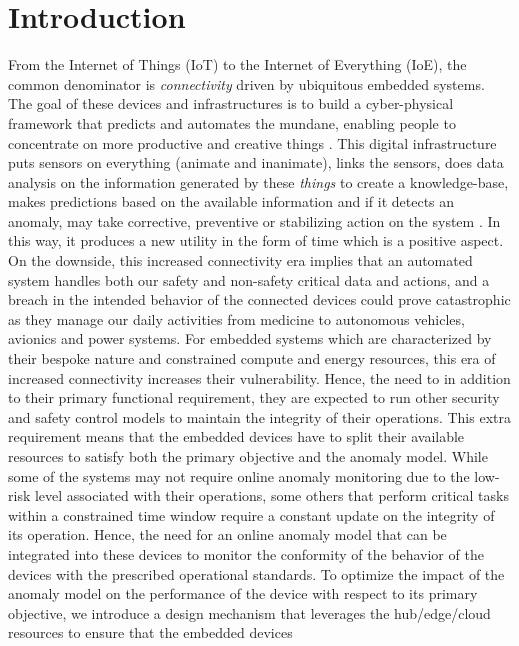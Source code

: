 \section{Introduction}
\label{sec:introduction}
From the Internet of Things (IoT) to the Internet of Everything (IoE), the 
common denominator is \emph{connectivity} driven by ubiquitous embedded 
systems. The goal of these devices and infrastructures is to build a 
cyber-physical framework that predicts and automates the mundane, enabling 
people to concentrate on more productive and creative things 
\cite{weldon2016future}. This digital infrastructure puts sensors on everything 
(animate and inanimate), links the sensors, does data analysis on the 
information generated by these \emph{things} to create a knowledge-base, makes 
predictions based on the available information and if it detects an anomaly, 
may take corrective, preventive or stabilizing action on the system 
\cite{ezeme2015multi}. In this way, it produces a new utility in the form of 
time which is a positive aspect. On the downside, this increased connectivity 
era implies that an automated system handles both our safety and non-safety 
critical data and actions, and a breach in the intended behavior of the 
connected devices could prove catastrophic as they manage our daily activities 
from medicine to autonomous vehicles, avionics and power systems. For embedded 
systems which are characterized by their bespoke nature and constrained 
compute and energy resources, this era of increased connectivity increases 
their vulnerability. Hence, the need to in addition to their primary functional 
requirement, they are expected to run other security and safety control models 
to maintain the integrity of their operations. This extra requirement means 
that the embedded devices have to split their available resources to satisfy 
both the primary objective and the anomaly model. While some of the systems may 
not require online anomaly monitoring due to the low-risk level associated with 
their operations, some others that perform critical tasks within a constrained 
time window require a constant update on the integrity of its operation. Hence, 
the need for an online anomaly model that can be integrated into these devices 
to monitor the conformity of the behavior of the devices with the prescribed 
operational standards. To optimize the impact of the anomaly model on the 
performance of the device 
with respect to its primary objective, we introduce a design mechanism that 
leverages the hub/edge/cloud resources to ensure that the embedded devices 
